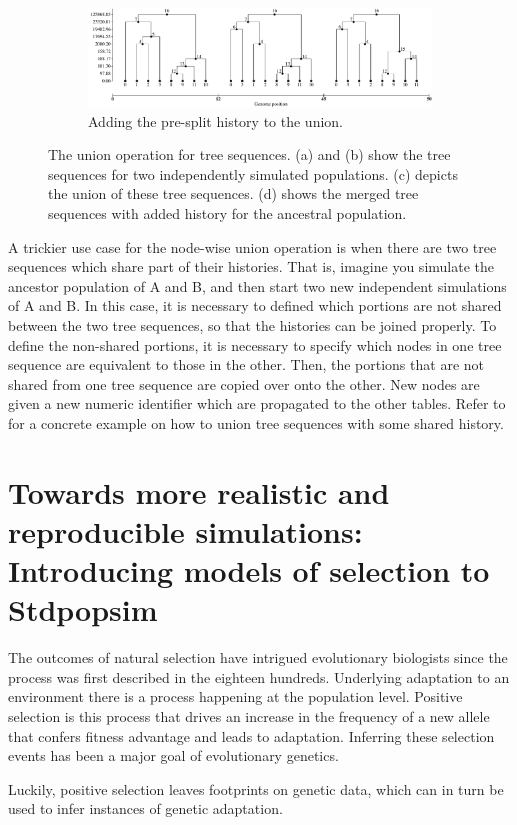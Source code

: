 \begin{figure}
\begin{subfigure}[b]{0.9\textwidth}
\includegraphics[width=\linewidth]{union_example/tsu_recap.pdf}
\caption{Adding the pre-split history to the union.}\label{fig:tsu_recap}
\end{subfigure}

\caption[The union operation for tree sequences]{The union operation for tree sequences.
(a) and (b) show the tree sequences for two independently simulated populations.
(c) depicts the union of these tree sequences.
(d) shows the merged tree sequences with added history for the ancestral population.}
\label{fig:union_op}
\end{figure}

A trickier use case for the node-wise union operation is when there are two tree sequences which share part of their histories.
That is, imagine you simulate the ancestor population of A and B, and then start two new independent simulations of A and B.
In this case, it is necessary to defined which portions are not shared between the two tree sequences,
so that the histories can be joined properly.
To define the non-shared portions, it is necessary to specify which nodes in one tree sequence are equivalent to those in the other.
Then, the portions that are not shared from one tree sequence are copied over onto the other.
New nodes are given a new numeric identifier which are propagated to the other tables.
Refer to \citet{rodrigues_vignette_2021} for a concrete example on how to union tree sequences with some shared history.

\section{Towards more realistic and reproducible simulations: Introducing models of selection to Stdpopsim}

The outcomes of natural selection have intrigued evolutionary biologists since the process was first described in the eighteen hundreds.
Underlying adaptation to an environment there is a process happening at the population level.
Positive selection is this process that drives an increase in the frequency of a new allele that confers fitness advantage and leads to adaptation.
Inferring these selection events has been a major goal of evolutionary genetics.

Luckily, positive selection leaves footprints on genetic data, which can in turn be used to infer instances of genetic adaptation.

